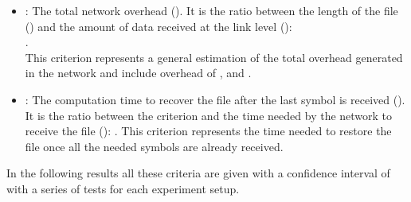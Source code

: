 \documentclass[a4paper]{article}
\begin{document}
\begin{itemize}
{\begin{itemize}
{                             for multicast streams, or  with
                                ethernet and IP headers.
                        }
                    \end{itemize}
            }
            \item{
                : The total network overhead (). It is the ratio
                    between the length of the file () and the
                    amount of data received at the link level
                    ():
                    \\
                    .
                     \\
                     This criterion represents a general estimation of the
                     total overhead generated in the network and include
                     overhead of ,  and .
            }
            \item{
                : The computation time to recover the file after the last
                     symbol is received (). It is the ratio
                    between the  criterion and the time needed by the
                    network to receive the file ():
                    .  This criterion
                     represents the time needed to restore the file once all the
                     needed symbols are already received.
            }
        \end{itemize}
        In the following results all these criteria are given with a confidence
        interval of  with a series of  tests for each experiment
        setup.
\end{document}

